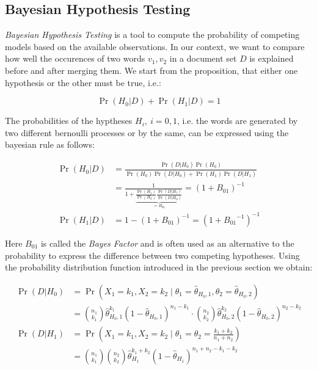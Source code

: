 \subsection{Bayesian Hypothesis Testing}

\emph{Bayesian Hypothesis Testing} is a tool to compute the probability of
competing models based on the available observations. In our context, we want to
compare how well the occurences of two words $v_1, v_2$ in a document set $D$ is
explained before and after merging them.
We start from the proposition, that either one hypothesis or the other must be true, i.e.:

\begin{equation*}
	\Pr(H_0|D) + \Pr(H_1|D) = 1
\end{equation*}

The probabilities of the hyptheses $H_i,~i=0,1$, i.e. the words are generated by
two different bernoulli processes or by the same, can be expressed using the
bayesian rule as follows:

\begin{equation*}
\begin{split}
	\Pr(H_0|D) &= \frac{\Pr(D|H_0)\Pr(H_0)}{\Pr(H_0)\Pr(D|H_0) + \Pr(H_1)\Pr(D|H_1)} \\
			 & =\frac{1}{1+
			 \underbrace{\frac{\Pr(H_1)}{\Pr(H_0)}\frac{\Pr(D|H_1)}{\Pr(D|H_0)}}_{
			 \coloneqq B_{01}}} = (1+B_{01})^{-1} \\
    \Pr(H_1|D) &= 1 - (1 + B_{01})^{-1}= \left(1+{B_{01}}^{-1}\right)^{-1}
\end{split}
\end{equation*}

Here $B_{01}$ is called the \emph{Bayes Factor} and is often used as an
alternative to the probability to express the difference between two competing hypotheses.
Using the probability distribution function introduced  in the previous
section we obtain: 

\begin{equation*}
\begin{split}
\Pr(D|H_0) &= \Pr\left(X_1=k_1, X_2=k_2 \mid \theta_1 = \hat{\theta}_{H_0,1},
\theta_2 = \hat{\theta}_{H_0,2}\right) \\
&=
\binom{n_1}{k_1}\hat{\theta}_{H_0,1}^{k_1}\left(1-\hat{\theta}_{H_0,1}\right)^{n_1-k_1}
\cdot
	\binom{n_2}{k_2}\hat{\theta}_{H_0,2}^{k_2}\left(1-\hat{\theta}_{H_0,2}\right)^{n_2-k_2} 
\\
\Pr(D|H_1) &= \Pr\left(X_1=k_1, X_2=k_2 \mid \theta_1 = \theta_2 = \frac{k_1 +
k_2}{n_1 + n_2}\right) \\
&= \binom{n_1}{k_1}\binom{n_2}{k_2}\hat{\theta}_{H_1}^{k_1 +
k_2}\left(1-\hat{\theta}_{H_1}\right)^{n_1 + n_2 - k_1 - k_2}
\end{split}
\end{equation*}

